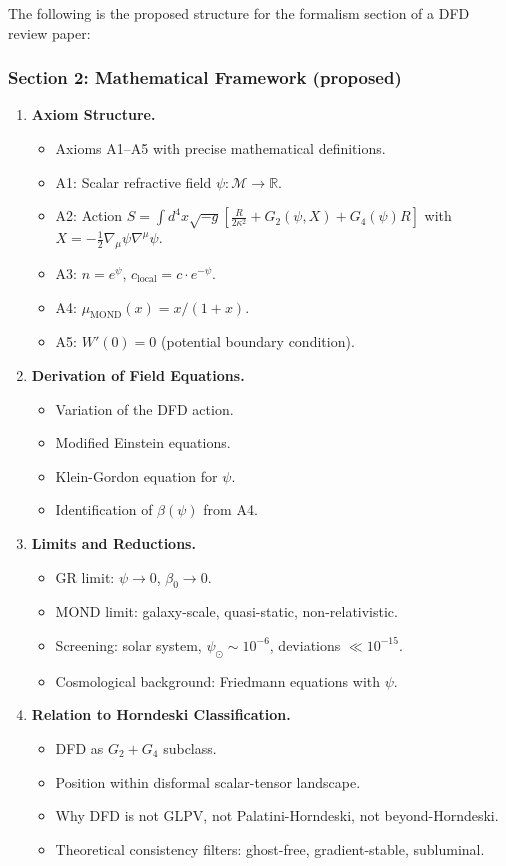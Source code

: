 \documentclass[11pt,a4paper]{article}
\begin{document}
The following is the proposed structure for the formalism section of a DFD review paper:

\subsubsection*{Section 2: Mathematical Framework (proposed)}

\begin{enumerate}
\item[2.1] \textbf{Axiom Structure.}
\begin{itemize}
\item Axioms A1--A5 with precise mathematical definitions.
\item A1: Scalar refractive field $\psi : \mathcal{M} \to \mathbb{R}$.
\item A2: Action $S = \int d^4x \sqrt{-g} \left[\frac{R}{2\kappa^2} + G_2(\psi, X) + G_4(\psi)R\right]$ with $X = -\frac{1}{2}\nabla_\mu\psi\nabla^\mu\psi$.
\item A3: $n = e^\psi$, $c_\mathrm{local} = c \cdot e^{-\psi}$.
\item A4: $\mu_\mathrm{MOND}(x) = x/(1+x)$.
\item A5: $W'(0) = 0$ (potential boundary condition).
\end{itemize}

\item[2.2] \textbf{Derivation of Field Equations.}
\begin{itemize}
\item Variation of the DFD action.
\item Modified Einstein equations.
\item Klein-Gordon equation for $\psi$.
\item Identification of $\beta(\psi)$ from A4.
\end{itemize}

\item[2.3] \textbf{Limits and Reductions.}
\begin{itemize}
\item GR limit: $\psi \to 0$, $\beta_0 \to 0$.
\item MOND limit: galaxy-scale, quasi-static, non-relativistic.
\item Screening: solar system, $\psi_\odot \sim 10^{-6}$, deviations $\ll 10^{-15}$.
\item Cosmological background: Friedmann equations with $\psi$.
\end{itemize}

\item[2.4] \textbf{Relation to Horndeski Classification.}
\begin{itemize}
\item DFD as $G_2 + G_4$ subclass.
\item Position within disformal scalar-tensor landscape.
\item Why DFD is not GLPV, not Palatini-Horndeski, not beyond-Horndeski.
\item Theoretical consistency filters: ghost-free, gradient-stable, subluminal.
\end{itemize}


\end{enumerate}
\end{document}
